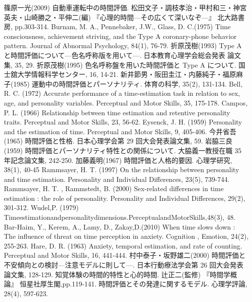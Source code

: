 \begin{thebibliography}{100}
篠原一光(2009) 自動車運転中の時間評価. 松田文子・調枝孝治・甲村和三・神宮英夫・山崎勝之・平伸二(編) 『心理的時間—その広くて深いなぞ—』 北大路書房, pp.303-314.
Burnam, M. A., Pennebaker, J.W., Glass, D. C.(1975) Time consciousness, achievement striving, and the Type A coronary-phone behavior pattern. Journal of Abnormal Psychology, 84(1), 76-79.
折原茂樹(1993) Type A と時間評価について—色名呼称版を用いて—. 日本教育心理学会総会発表 論文集, 35, 29.
折原茂樹(1995) 色名呼称盤を用いた時間評価と Type A について. 国士舘大学情報科学センター, 16, 14-21.
新井節男・阪田圭江・内藤純子・福原麻子(1985) 運動中の時間評価とパーソナリティ. 体育の科学, 35(2), 131-134.
Bell, R. C. (1972) Accurate performance of a time-estimation task in relation to sex, age, and personality variables. Perceptual and Motor Skills, 35, 175-178.
Campos, P. L. (1966) Relationship between time estimation and retentive personality traits. Perceptual and Motor Skills, 23, 56-62.
Eysenck, J. H. (1959) Personality and the estimation of time. Perceptual and Motor Skills, 9, 405-406.
今井省吾(1965) 時間評価と性格. 日本心理学会第 29 回大会発表論文集, 59.
岩脇三良(1959) 時間評価とパーソナリティ特性との関係について. 大脇義一教授在職 35 年記念論文集, 242-250.
加藤義明(1967) 時間評価と人格的要因. 心理学研究, 38(1), 40-45
Rammsayer, H. T. (1997) On the relationship between personality and time estimation. Personality and Individual Differences, 23(5), 739-744.
Rammsayer, H. T. ,  Rammstedt, B. (2000) Sex-related differences in time estimation : the role of personality. Personality and Individual Differences, 29(2), 301-312.
Wudel,P. (1979) Timeestimationandpersonalitydimensions.PerceptualandMotorSkills,48(3), 48.
Bar-Haim, Y., Kerem, A., Lamy, D., Zakay,D.(2010) When time slows down : The influence of threat on time perception in anxiety. Cognition ,  Emotion, 24(2), 255-263.
Hare, D. R. (1963) Anxiety, temporal estimation, and rate of counting. Perceptual and Motor Skills, 16, 441-444.
村中泰子・坂野雄二(2000) 時間評価と不安傾向との検討—注意モデルに則して—. 日本行動療法学会第 26 回大会発表論文集, 128-129.
%
知覚体験の時間的特性と心的時間. 辻正二(監修) 『時間学概論』 恒星社厚生閣,pp.119-141.
時間評価とその発達に関するモデル. 心理学評論, 28(4), 597-623.

\end{thebibliography}

